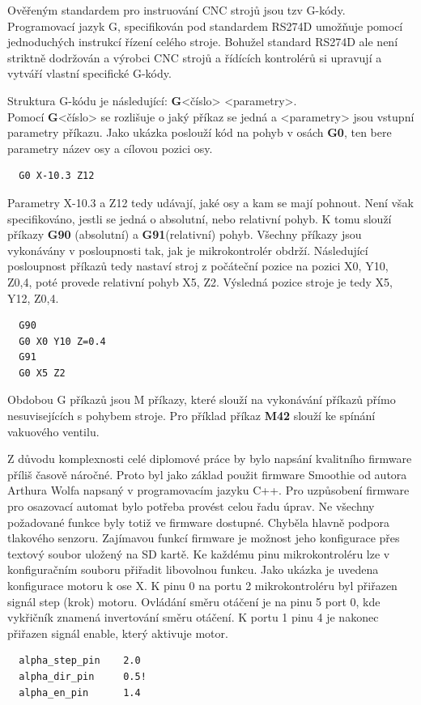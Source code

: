 Ověřeným standardem pro instruování CNC strojů jsou tzv G-kódy. Programovací jazyk G, specifikován pod standardem RS274D umožňuje pomocí jednoduchých instrukcí řízení celého stroje. Bohužel standard RS274D ale není striktně dodržován a výrobci CNC strojů a řídících kontrolérů si upravují a vytváří vlastní specifické G-kódy.

Struktura G-kódu je následující: {\bf G}<číslo> <parametry>.\\
Pomocí {\bf G}<číslo> se rozlišuje o jaký příkaz se jedná a <parametry> jsou vstupní parametry příkazu. Jako ukázka poslouží kód na pohyb v osách {\bf G0}, ten bere parametry název osy a cílovou pozici osy.
\begin{verbatim}
  G0 X-10.3 Z12
\end{verbatim}

Parametry X-10.3 a Z12 tedy udávají, jaké osy a kam se mají pohnout. Není však specifikováno, jestli se jedná o absolutní, nebo relativní pohyb. K tomu slouží příkazy {\bf G90} (absolutní) a {\bf G91}(relativní) pohyb.
Všechny příkazy jsou vykonávány v posloupnosti tak, jak je mikrokontrolér obdrží. Následující posloupnost příkazů tedy nastaví stroj z počáteční pozice na pozici X0, Y10, Z0,4, poté provede relativní pohyb X5, Z2. Výsledná pozice stroje je tedy X5, Y12, Z0,4.

\begin{verbatim}
  G90
  G0 X0 Y10 Z=0.4
  G91
  G0 X5 Z2
\end{verbatim}

Obdobou G příkazů jsou M příkazy, které slouží na vykonávání příkazů přímo nesuvisejících s pohybem stroje. Pro příklad příkaz {\bf M42} slouží ke spínání vakuového ventilu.

Z důvodu komplexnosti celé diplomové práce by bylo napsání kvalitního firmware příliš časově náročné. Proto byl jako základ použit firmware Smoothie od autora Arthura Wolfa napsaný v programovacím jazyku C++. Pro uzpůsobení firmware pro osazovací automat bylo potřeba provést celou řadu úprav. Ne všechny požadované funkce byly totiž ve firmware dostupné. Chyběla hlavně podpora tlakového senzoru.
Zajímavou funkcí firmware je možnost jeho konfigurace přes textový soubor uložený na SD kartě. Ke každému pinu mikrokontroléru lze v konfiguračním souboru přiřadit libovolnou funkcu. 
Jako ukázka je uvedena konfigurace motoru k ose X. K pinu 0 na portu 2 mikrokontroléru byl přiřazen signál step (krok) motoru. Ovládání směru otáčení je na pinu 5 port 0, kde vykřičník znamená invertování směru otáčení. K portu 1 pinu 4 je nakonec přiřazen signál enable, který aktivuje motor.
\begin{verbatim}
  alpha_step_pin	2.0
  alpha_dir_pin		0.5!
  alpha_en_pin		1.4
\end{verbatim}


